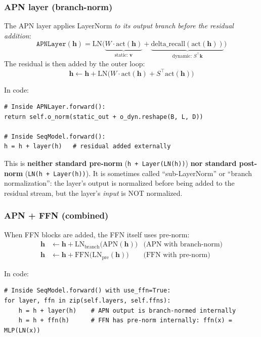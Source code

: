 \documentclass[11pt,a4paper]{article}
\begin{document}
\subsubsection{APN layer (branch-norm)}

The APN layer applies LayerNorm \emph{to its output branch before the residual addition}:
\begin{equation}
\texttt{APNLayer}(\mathbf{h}) = \text{LN}\bigl(\underbrace{W \cdot \text{act}(\mathbf{h})}_{\text{static: } \mathbf{v}} + \underbrace{\text{delta\_recall}(\text{act}(\mathbf{h}))}_{\text{dynamic: } S^\top\mathbf{k}}\bigr)
\end{equation}
The residual is then added by the outer loop:
\begin{equation}
\mathbf{h} \leftarrow \mathbf{h} + \text{LN}\bigl(W \cdot \text{act}(\mathbf{h}) + S^\top \text{act}(\mathbf{h})\bigr)
\end{equation}

In code:
\begin{verbatim}
# Inside APNLayer.forward():
return self.o_norm(static_out + o_dyn.reshape(B, L, D))

# Inside SeqModel.forward():
h = h + layer(h)   # residual added externally
\end{verbatim}

This is \textbf{neither standard pre-norm} (\texttt{h + Layer(LN(h))}) \textbf{nor standard post-norm} (\texttt{LN(h + Layer(h))}).
It is sometimes called ``sub-LayerNorm'' or ``branch normalization'': the layer's output is normalized before being added to the residual stream, but the layer's \emph{input} is NOT normalized.

\subsubsection{APN + FFN (combined)}

When FFN blocks are added, the FFN itself uses pre-norm:
\begin{align}
\mathbf{h} &\leftarrow \mathbf{h} + \text{LN}_{\text{branch}}\bigl(\text{APN}(\mathbf{h})\bigr) & \text{(APN with branch-norm)} \\
\mathbf{h} &\leftarrow \mathbf{h} + \text{FFN}\bigl(\text{LN}_{\text{pre}}(\mathbf{h})\bigr) & \text{(FFN with pre-norm)}
\end{align}

In code:
\begin{verbatim}
# Inside SeqModel.forward() with use_ffn=True:
for layer, ffn in zip(self.layers, self.ffns):
    h = h + layer(h)    # APN output is branch-normed internally
    h = h + ffn(h)      # FFN has pre-norm internally: ffn(x) = MLP(LN(x))
\end{verbatim}
\end{document}
